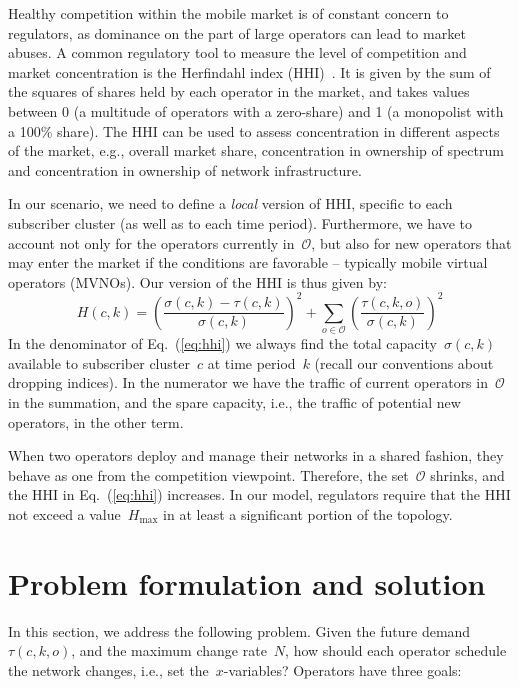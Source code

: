 \documentclass[10pt,journal,cspaper,compsoc]{IEEEtran}
\newcommand{\Eq}[1]{Eq.~(\ref{eq:#1})}
\newcommand{\Oc}{\mathcal{O}}
\begin{document}
Healthy competition within the mobile market is of constant concern to regulators, as
dominance on the part of large operators can lead to market abuses. A common regulatory
tool to measure the level of competition and market concentration is the Herfindahl index
(HHI)~\cite{mergers, EULaw}. It is given by the sum of the squares of shares held by each
operator in the market, and takes values between 0 (a multitude of operators with a zero-share)
and 1 (a monopolist with a 100\% share).
The HHI can be used to assess concentration in different aspects of the market, e.g.,
overall market share, concentration in ownership of spectrum and concentration
in ownership of network infrastructure.

In our scenario, we need to define a {\em local} version of HHI, specific to each
subscriber cluster (as well as to each time period). Furthermore, we have to account not
only for the operators currently in~$\Oc$, but also for new operators that may enter the
market if the conditions are favorable -- typically mobile virtual operators (MVNOs).
Our version of the HHI is thus given by:
\begin{equation}
\label{eq:hhi}
H(c,k)=
\left(\frac{\sigma(c,k)-\tau(c,k)}{\sigma(c,k)}\right)^2
+
\sum_{o\in\Oc}\left (\frac{\tau(c,k,o)}{\sigma(c,k)}\right)^2
\end{equation}
In the denominator of \Eq{hhi} we always find the total capacity~$\sigma(c,k)$
available to subscriber cluster~$c$ at time period~$k$ (recall our conventions
about dropping indices). In the numerator we have the traffic of current operators
in~$\Oc$ in the summation, and the spare capacity, i.e., the traffic of potential
new operators, in the other term.

When two operators deploy and manage their networks in a shared fashion, they
behave as one from the competition viewpoint. Therefore, the set~$\Oc$ shrinks,
and the HHI in \Eq{hhi} increases. In our model, regulators require that the HHI not exceed a value~$H_{\max}$ in at least a significant portion of the topology.

\section{Problem formulation and solution}
\label{sec:problem}

In this section, we address the following problem. Given the future demand~$\tau(c,k,o)$, and the maximum
change rate~$N$, how should each operator schedule the network
changes, i.e., set the~$x$-variables?
Operators have three goals:
\end{document}
